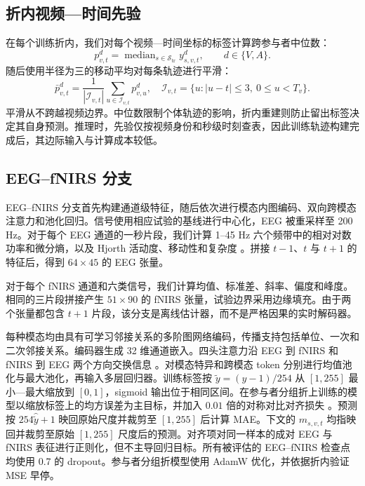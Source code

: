 \subsection{折内视频—时间先验}

在每个训练折内，我们对每个视频—时间坐标的标签计算跨参与者中位数：
\begin{equation}
 p^d_{v,t} =
 \operatorname{median}_{s\in\mathcal S_{\mathrm{tr}}} y^d_{s,v,t},
 \qquad d\in\{V,A\}.
\end{equation}
随后使用半径为三的移动平均对每条轨迹进行平滑：
\begin{equation}
 \bar p^d_{v,t} =
 \frac{1}{|\mathcal I_{v,t}|}
 \sum_{u\in\mathcal I_{v,t}} p^d_{v,u},
 \quad
 \mathcal I_{v,t}=\{u:|u-t|\leq3,\ 0\leq u<T_v\}.
\end{equation}
平滑从不跨越视频边界。中位数限制个体轨迹的影响，折内重建则防止留出标签决定其自身预测。推理时，先验仅按视频身份和秒级时刻查表，因此训练轨迹构建完成后，其边际输入与计算成本较低。

\subsection{EEG--fNIRS 分支}

EEG--fNIRS 分支首先构建通道级特征，随后依次进行模态内图编码、双向跨模态注意力和池化回归。信号使用相应试验的基线进行中心化，EEG 被重采样至 200 Hz。对于每个 EEG 通道的一秒片段，我们计算 1--45 Hz 六个频带中的相对对数功率和微分熵，以及 Hjorth 活动度、移动性和复杂度
\cite{hjorth1970eeg}。拼接 \(t-1\)、\(t\) 与 \(t+1\) 的特征后，得到 \(64\times45\) 的 EEG 张量。

对于每个 fNIRS 通道和六类信号，我们计算均值、标准差、斜率、偏度和峰度。相同的三片段拼接产生 \(51\times90\) 的 fNIRS 张量，试验边界采用边缘填充。由于两个张量都包含 \(t+1\) 片段，该分支是离线估计器，而不是严格因果的实时解码器。

每种模态均由具有可学习邻接关系的多阶图网络编码，传播支持包括单位、一次和二次邻接关系。编码器生成 32 维通道嵌入。四头注意力沿 EEG 到 fNIRS 和 fNIRS 到 EEG 两个方向交换信息
\cite{vaswani2017attention,tsai2019multimodal}。对模态特异和跨模态 token 分别进行均值池化与最大池化，再输入多层回归器。训练标签按 \(\tilde y=(y-1)/254\) 从 \([1,255]\) 最小—最大缩放到 \([0,1]\)，sigmoid 输出位于相同区间。在参与者分组折上训练的模型以缩放标签上的均方误差为主目标，并加入 \(0.01\) 倍的对称对比对齐损失
\cite{chen2020simclr}。预测按 \(254\hat{\tilde y}+1\) 映回原始尺度并裁剪至 \([1,255]\) 后计算 MAE。下文的 \(m_{s,v,t}\) 均指映回并裁剪至原始 \([1,255]\) 尺度后的预测。对齐项对同一样本的成对 EEG 与 fNIRS 表征进行正则化，但不主导回归目标。所有被评估的 EEG--fNIRS 检查点均使用 0.7 的 dropout。参与者分组折模型使用 AdamW 优化，并依据折内验证 MSE 早停。

